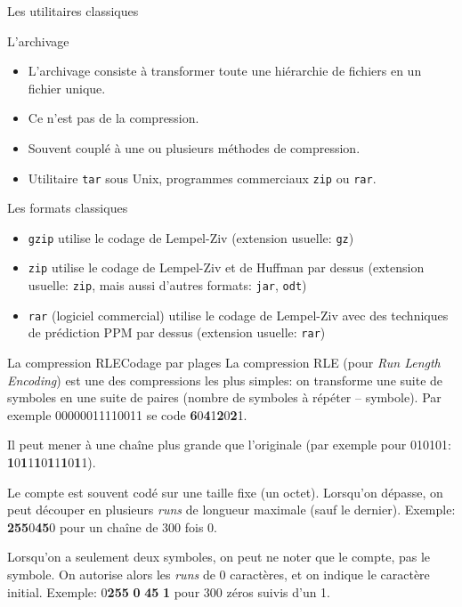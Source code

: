 \begin{frame}{Les utilitaires classiques}
  \begin{block}{L'archivage}
    \begin{itemize}
    \item[\dialogwarning] L'archivage consiste à transformer toute une
      hiérarchie de fichiers en un fichier unique.
    \item[\dialogerror] Ce n'est pas de la compression.
    \item Souvent couplé à une ou plusieurs méthodes de compression.
    \item Utilitaire \texttt{tar} sous Unix, programmes commerciaux
      \texttt{zip} ou \texttt{rar}.
    \end{itemize}
  \end{block}
  \begin{block}{Les formats classiques}
    \begin{itemize}
    \item \texttt{gzip} utilise le codage de Lempel-Ziv (extension usuelle:
      \texttt{gz})
    \item \texttt{zip} utilise le codage de Lempel-Ziv et de Huffman par
      dessus (extension usuelle: \texttt{zip}, mais aussi d'autres formats:
      \texttt{jar}, \texttt{odt})
    \item \texttt{rar} (logiciel commercial) utilise le codage de Lempel-Ziv
      avec des techniques de prédiction PPM par dessus (extension usuelle:
      \texttt{rar})
    \end{itemize}
  \end{block}
\end{frame}
\begin{frame}{La compression RLE}{Codage par plages}
  La compression RLE (pour \emph{Run Length Encoding}) est une des
  compressions les plus simples: on transforme une suite de symboles en une
  suite de paires (nombre de symboles à répéter -- symbole). Par exemple
  00000011110011 se code \textbf{6}0\textbf{4}1\textbf{2}0\textbf{2}1.

  Il peut mener à une chaîne plus grande que l'originale (par exemple pour
  010101: \textbf{1}0\textbf{1}1\textbf{1}0\textbf{1}1\textbf{1}0\textbf{1}1).

  Le compte est souvent codé sur une taille fixe (un octet). Lorsqu'on
  dépasse, on peut découper en plusieurs \emph{runs} de longueur maximale
  (sauf le dernier). Exemple: \textbf{255}0\textbf{45}0 pour un chaîne de 300
  fois {0}.

  Lorsqu'on a seulement deux symboles, on peut ne noter que le compte, pas le
  symbole. On autorise alors les \emph{runs} de 0 caractères, et on indique le
  caractère initial. Exemple: 0\textbf{255} \textbf{0} \textbf{45} \textbf{1}
  pour 300 zéros suivis d'un 1.
\end{frame}
